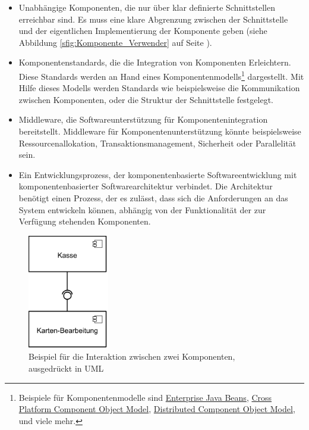 \begin{itemize}
\item Unabhängige Komponenten, die nur über klar definierte Schnittstellen erreichbar sind. Es muss eine klare Abgrenzung zwischen der Schnittstelle und der eigentlichen Implementierung der Komponente geben (siehe Abbildung \ref{sfig:Komponente_Verwender} auf Seite \pageref{sfig:Komponente_Verwender}).
\item Komponentenstandards, die die Integration von Komponenten Erleichtern. Diese Standards werden an Hand eines Komponentenmodells\footnote{Beispiele für Komponentenmodelle sind \href{http://www.oracle.com/technetwork/java/javaee/ejb/index.html}{Enterprise Java Beans}, \href{https://developer.mozilla.org/de/docs/XPCOM}{Cross Platform Component Object Model}, \href{http://technet.microsoft.com/en-us/library/cc958799.aspx}{Distributed Component Object Model}, und viele mehr.} dargestellt. Mit Hilfe dieses Modells werden Standards wie beispielsweise die Kommunikation zwischen Komponenten, oder die Struktur der Schnittstelle festgelegt.
\item Middleware, die Softwareunterstützung für Komponentenintegration bereitstellt. Middleware für Komponentenunterstützung könnte beispielsweise Ressourcenallokation, Transaktionsmanagement, Sicherheit oder Parallelität sein.
\item Ein Entwicklungsprozess, der komponentenbasierte Softwareentwicklung mit komponentenbasierter Softwarearchitektur verbindet. Die Architektur benötigt einen Prozess, der es zulässt, dass sich die Anforderungen an das System entwickeln können, abhängig von der Funktionalität der zur Verfügung stehenden Komponenten.
\end{itemize}

\begin{figure}[h]
\centering
\includegraphics[height=5.0cm]{images/CBSE.png}
\caption[
Beispiel für die Interaktion zwischen zwei Komponenten, ausgedrückt in UML
]{Beispiel für die Interaktion zwischen zwei Komponenten, ausgedrückt in UML}
\label{fig:2_CBSE}
\end{figure}

